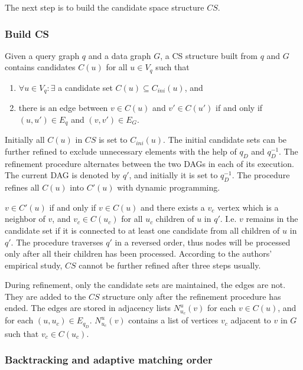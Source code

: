 The next step is to build the candidate space structure $CS$.

\subsubsection{Build CS}

Given a query graph $q$ and a data graph $G$, a CS structure built from $q$ and $G$ contains candidates $C(u)$
for all $u \in V_q$ such that

\begin{enumerate}
    \item $\forall u \in V_q : \exists$ a candidate set $C(u) \subseteq C_{ini}(u)$, and
    \item there is an edge between $v \in C(u)$ and $v' \in C(u')$ if and only if $(u, u') \in E_q$ and $(v, v') \in E_G$.
\end{enumerate}

Initially all $C(u)$ in $CS$ is set to $C_{ini}(u)$. The initial candidate sets can be further refined
to exclude unnecessary elements with the help of $q_D$ and $q^{-1}_D$. The refinement procedure alternates
between the two DAGs in each of its execution. The current DAG is denoted by $q'$, and initially it is set
to $q^{-1}_D$. The procedure refines all $C(u)$ into $C'(u)$ with dynamic programming.

$v \in C'(u)$ if and only if $v \in C(u)$ and there exists a $v_c$ vertex which is a neighbor of $v$, and
$v_c \in C(u_c)$ for all $u_c$ children of $u$ in $q'$. I.e. $v$ remains in the candidate set if it is
connected to at least one candidate from all children of $u$ in $q'$. The procedure traverses $q'$ in a
reversed order, thus nodes will be processed only after all their children has been processed. According to
the authors' empirical study, $CS$ cannot be further refined after three steps usually.

During refinement, only the candidate sets are maintained, the edges are not. They are added to the $CS$
structure only after the refinement procedure has ended. The edges are stored in adjacency lists $N^u_{u_c}(v)$
for each $v \in C(u)$, and for each $(u, u_c) \in E_{q_D}$. $N^u_{u_c}(v)$ contains a list of vertices $v_c$
adjacent to $v$ in $G$ such that $v_c \in C(u_c)$.

\subsubsection{Backtracking and adaptive matching order}

